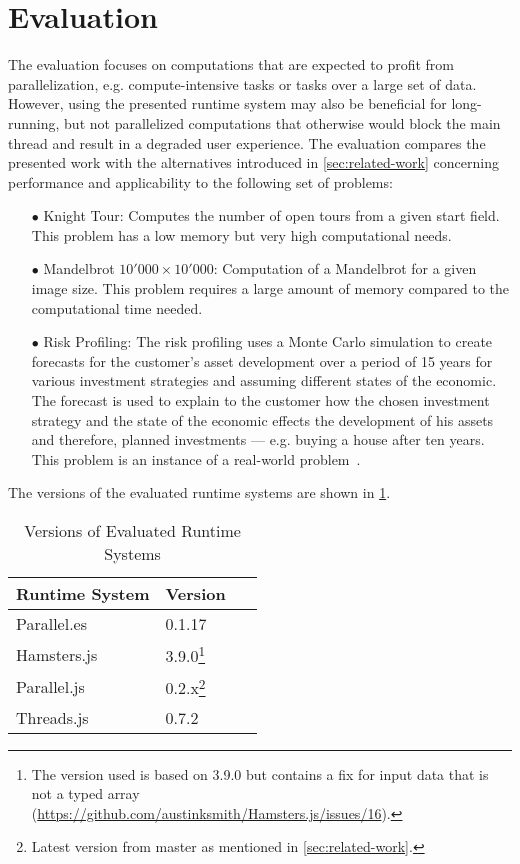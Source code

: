 \section{Evaluation}\label{sec:evaluation}
The evaluation focuses on computations that are expected to profit from parallelization, e.g. compute-intensive tasks or tasks over a large set of data. However, using the presented runtime system may also be beneficial for long-running, but not parallelized computations that otherwise would block the main thread and result in a degraded user experience. The evaluation compares the presented work with the alternatives introduced in \cref{sec:related-work} concerning performance and applicability to the following set of problems:

\begin{itemize}
	\item[$\bullet$] Knight Tour: Computes the number of open tours from a given start field. This problem has a low memory but very high computational needs.
	\item[$\bullet$] Mandelbrot $10'000 \times 10'000$: Computation of a Mandelbrot for a given image size. This problem requires a large amount of memory compared to the computational time needed.
	\item[$\bullet$] Risk Profiling: The risk profiling uses a Monte Carlo simulation to create forecasts for the customer's asset development over a period of 15 years for various investment strategies and assuming different states of the economic. The forecast is used to explain to the customer how the chosen investment strategy and the state of the economic effects the development of his assets and therefore, planned investments --- e.g. buying a house after ten years. This problem is an instance of a real-world problem~\cite{Kwsoft2016}.
\end{itemize}

The versions of the evaluated runtime systems are shown in \cref{tab:runtime-system-version}.

\begin{table}
	\centering
	\begin{tabular}{p{0.6\linewidth} l}
		\toprule
		Runtime System & Version \\ \midrule
		Parallel.es & 0.1.17 \\
		Hamsters.js & 3.9.0\footnote{The version used is based on 3.9.0 but contains a fix for input data that is not a typed array (\url{https://github.com/austinksmith/Hamsters.js/issues/16}).} \\
		Parallel.js & 0.2.x\footnote{Latest version from master as mentioned in \cref{sec:related-work}.} \\
		Threads.js & 0.7.2 \\ \bottomrule
	\end{tabular}
	\caption{Versions of Evaluated Runtime Systems}
	\label{tab:runtime-system-version}
\end{table}


